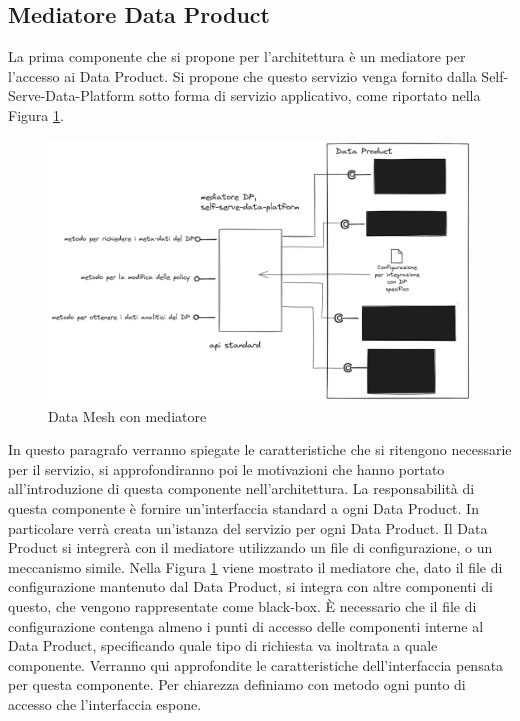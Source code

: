 \documentclass[12pt]{report}
\begin{document}
\subsection{Mediatore Data Product}
La prima componente che si propone per l'architettura è un mediatore per l'accesso ai Data Product.
Si propone che questo servizio venga fornito dalla Self-Serve-Data-Platform sotto forma di servizio applicativo, come riportato nella Figura \ref{fig:dp solo mediatore}.
\begin{figure}
    \centering
    \includegraphics[width=\linewidth]{immagini/Data mesh con interfaccie.png}
    \caption{Data Mesh con mediatore}
    \label{fig:dp solo mediatore}
\end{figure}
In questo paragrafo verranno spiegate le caratteristiche che si ritengono necessarie per il servizio, si approfondiranno poi le motivazioni che hanno portato all'introduzione di questa componente nell'architettura.
La responsabilità di questa componente è fornire un'interfaccia standard a ogni Data Product.
In particolare verrà creata un'istanza del servizio per ogni Data Product.
Il Data Product si integrerà con il mediatore utilizzando un file di configurazione, o un meccanismo simile.
Nella Figura \ref{fig:dp solo mediatore}  viene mostrato il mediatore che, dato il file di configurazione mantenuto dal Data Product, si integra con altre componenti di questo, che vengono rappresentate come black-box.
È necessario che il file di configurazione contenga almeno i punti di accesso delle componenti interne al Data Product, specificando quale tipo di richiesta va inoltrata a quale componente.
Verranno qui approfondite le caratteristiche  dell'interfaccia pensata per questa componente.
Per chiarezza definiamo con metodo ogni punto di accesso che l'interfaccia espone.
\end{document}
